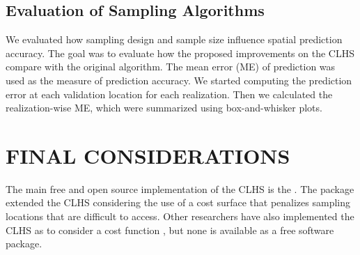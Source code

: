 \subsection{Evaluation of Sampling Algorithms}

We evaluated how sampling design and sample size influence spatial prediction accuracy. The goal was to 
evaluate how the proposed improvements on the CLHS compare with the original algorithm. The mean error (ME) of 
prediction was used as the measure of prediction accuracy. We started computing the prediction error at each 
validation location for each realization. Then we calculated the realization-wise ME, which were summarized 
using box-and-whisker plots. 

\section{FINAL CONSIDERATIONS}

The main free and open source implementation of the CLHS is the  \cite{RoudierEtAl2012}. The 
package extended the CLHS considering the use of a cost surface that penalizes sampling locations that are 
difficult to access. Other researchers have also implemented the CLHS as to consider a cost function 
\cite{MulderEtAl2013, CliffordEtAl2014}, but none is available as a free software package.
